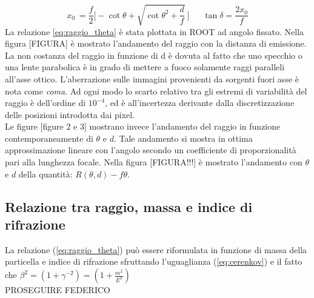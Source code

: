 \documentclass[8pt]{extarticle}
\begin{document}
\begin{equation}
x_0 \ = \frac{f}{2} \Bigg[-\cot{\theta}+\sqrt{\cot{\theta}^2+\frac{d}{f}}\ \Bigg] \ \ \ \ \ \ \ \tan{\delta}=\frac{2x_0}{f}
\end{equation}
La relazione \ref{eq:raggio_theta} è stata plottata in ROOT ad angolo fissato. Nella figura [FIGURA] è mostrato l'andamento del raggio con la distanza di emissione.\\
La non costanza del raggio in funzione di d è dovuta al fatto che uno specchio o una lente parabolica è in grado di mettere a fuoco solamente raggi paralleli all'asse ottico. L'aberrazione sulle immagini provenienti da sorgenti fuori asse è nota come \textit{coma}.
Ad ogni modo lo scarto relativo tra gli estremi di variabilità del raggio è dell'ordine di $10^{-4}$, ed è all'incertezza derivante dalla discretizzazione delle posizioni introdotta dai pixel.\\
Le figure [figure 2 e 3] mostrano invece l'andamento del raggio in funzione contemporaneamente di $\theta$ e $d$. Tale andamento si mostra in ottima approssimazione lineare con l'angolo secondo un coefficiente di proporzionalità pari alla lunghezza focale. Nella figura [FIGURA!!!] è mostrato l'andamento con $\theta$ e $d$ della quantità: $R(\theta,d)-f\theta$.
\subsection{Relazione tra raggio, massa e indice di rifrazione}
La relazione (\ref{eq:raggio_theta}) può essere riformulata in funzione di massa della particella e indice di rifrazione sfruttando l'uguaglianza (\ref{eq:cerenkov}) e il fatto che $\beta^2=(1+\gamma^{-2})=(1+\frac{m^2}{E^2})$
\\
PROSEGUIRE FEDERICO
\\
\\
\end{document}

